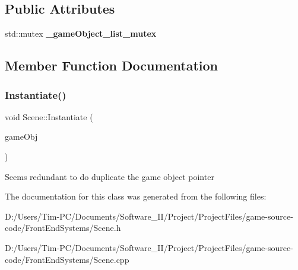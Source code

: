 \subsection*{Public Attributes}
\begin{DoxyCompactItemize}
\item 
\mbox{\label{class_scene_a29183cf37f5227ea9a82d2a15c42336c}} 
std\+::mutex {\bfseries \+\_\+game\+Object\+\_\+list\+\_\+mutex}
\end{DoxyCompactItemize}


\subsection{Member Function Documentation}
\mbox{\label{class_scene_a3dd730cba4a22bf75e54c4b644c26976}} 
\subsubsection{\texorpdfstring{Instantiate()}{Instantiate()}}
{\footnotesize\ttfamily void Scene\+::\+Instantiate (\begin{DoxyParamCaption}\item[{shared\+\_\+ptr$<$ \hyperlink{class_game_object}{Game\+Object} $>$}]{game\+Obj }\end{DoxyParamCaption})}

Seems redundant to do duplicate the game object pointer 

The documentation for this class was generated from the following files\+:\begin{DoxyCompactItemize}
\item 
D\+:/\+Users/\+Tim-\/\+P\+C/\+Documents/\+Software\+\_\+\+I\+I/\+Project/\+Project\+Files/game-\/source-\/code/\+Front\+End\+Systems/Scene.\+h\item 
D\+:/\+Users/\+Tim-\/\+P\+C/\+Documents/\+Software\+\_\+\+I\+I/\+Project/\+Project\+Files/game-\/source-\/code/\+Front\+End\+Systems/Scene.\+cpp\end{DoxyCompactItemize}

